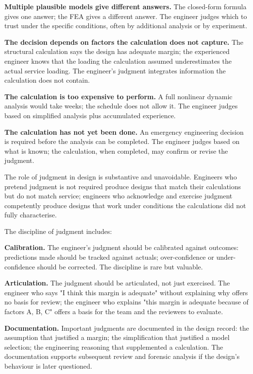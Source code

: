 \textbf{Multiple plausible models give different answers.} The closed-form formula gives one answer; the FEA gives a different answer. The engineer judges which to trust under the specific conditions, often by additional analysis or by experiment.

\textbf{The decision depends on factors the calculation does not capture.} The structural calculation says the design has adequate margin; the experienced engineer knows that the loading the calculation assumed underestimates the actual service loading. The engineer's judgment integrates information the calculation does not contain.

\textbf{The calculation is too expensive to perform.} A full nonlinear dynamic analysis would take weeks; the schedule does not allow it. The engineer judges based on simplified analysis plus accumulated experience.

\textbf{The calculation has not yet been done.} An emergency engineering decision is required before the analysis can be completed. The engineer judges based on what is known; the calculation, when completed, may confirm or revise the judgment.

The role of judgment in design is substantive and unavoidable. Engineers who pretend judgment is not required produce designs that match their calculations but do not match service; engineers who acknowledge and exercise judgment competently produce designs that work under conditions the calculations did not fully characterise.

The discipline of judgment includes:

\textbf{Calibration.} The engineer's judgment should be calibrated against outcomes: predictions made should be tracked against actuals; over-confidence or under-confidence should be corrected. The discipline is rare but valuable.

\textbf{Articulation.} The judgment should be articulated, not just exercised. The engineer who says "I think this margin is adequate" without explaining why offers no basis for review; the engineer who explains "this margin is adequate because of factors A, B, C" offers a basis for the team and the reviewers to evaluate.

\textbf{Documentation.} Important judgments are documented in the design record: the assumption that justified a margin; the simplification that justified a model selection; the engineering reasoning that supplemented a calculation. The documentation supports subsequent review and forensic analysis if the design's behaviour is later questioned.

